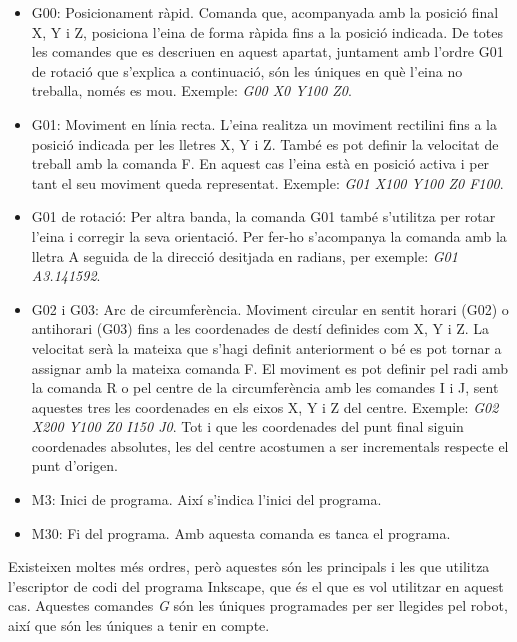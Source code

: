 \begin{itemize}
	\item	G00: Posicionament ràpid. Comanda que, acompanyada amb la posició final X, Y i Z, posiciona l'eina de forma ràpida fins a la posició indicada. De totes les comandes que es descriuen en aquest apartat, juntament amb l'ordre G01 de rotació que s'explica a continuació, són les úniques en què l'eina no treballa, només es mou. Exemple: \emph{G00 X0 Y100 Z0}.
	
	\item	G01: Moviment en línia recta. L'eina realitza un moviment rectilini fins a la posició indicada per les lletres X, Y i Z. També es pot definir la velocitat de treball amb la comanda F. En aquest cas l'eina està en posició activa i per tant el seu moviment queda representat. Exemple: \emph{G01 X100 Y100 Z0 F100}. 
	
	\item G01 de rotació: Per altra banda, la comanda G01 també s'utilitza per rotar l'eina i corregir la seva orientació. Per fer-ho s'acompanya la comanda  amb la lletra A seguida de la direcció desitjada en radians, per exemple: \emph{G01 A3.141592}.
	
	\item	G02 i G03: Arc de circumferència.  Moviment circular en sentit horari (G02) o antihorari (G03) fins a les coordenades de destí definides com X, Y i Z. La velocitat serà la mateixa que s'hagi definit anteriorment o bé es pot tornar a assignar amb la mateixa comanda F. El moviment es pot definir pel radi amb la comanda R o pel centre de la circumferència amb les comandes I i J, sent aquestes tres les coordenades en els eixos X, Y i Z del centre. Exemple: \emph{G02 X200 Y100 Z0 I150 J0}. Tot i que les coordenades del punt final siguin coordenades absolutes, les del centre acostumen a ser incrementals respecte el punt d'origen.
	
	\item	M3: Inici de programa. Així s'indica l'inici del programa.
	
	\item	M30: Fi del programa. Amb aquesta comanda es tanca el programa. 
\end{itemize}
Existeixen moltes més ordres, però aquestes són les principals i les que utilitza l'escriptor de codi  del programa Inkscape, que és el que es vol utilitzar en aquest cas. Aquestes comandes \emph{G} són les úniques programades per ser llegides pel robot, així que són les úniques a tenir en compte. 



